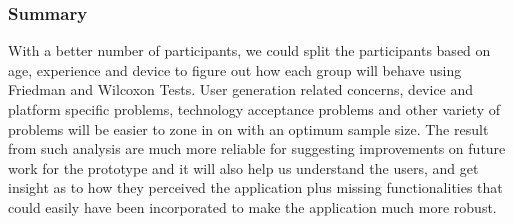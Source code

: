 \subsubsection{Summary}
With a better number of participants, we could split the participants based on age, experience and device to figure out how each group will behave using Friedman\cite{Friedman} and Wilcoxon\cite{Wilcoxon} Tests. User generation related concerns, device and platform specific problems, technology acceptance problems and other variety of problems will be easier to zone in on with an optimum sample size. The result from such analysis are much more reliable for suggesting improvements on future work for the prototype and it will also help us understand the users, and get insight as to how they perceived the application plus missing functionalities that could easily have been incorporated to make the application much more robust.
\newpage

